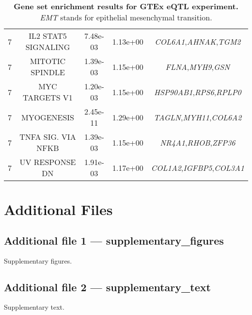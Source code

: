 \documentclass{bmcart}
\begin{document}
\begin{backmatter}
\begin{table}[]
\begin{tabular}{|| c | c | c | c | c ||}
      7 &               IL2 STAT5 SIGNALING &        7.48e-03 & 1.13e+00 &    \emph{COL6A1},\emph{AHNAK},\emph{TGM2} \\
      7 &                   MITOTIC SPINDLE &        1.39e-03 & 1.15e+00 &        \emph{FLNA},\emph{MYH9},\emph{GSN} \\
      7 &                    MYC TARGETS V1 &        1.20e-03 & 1.15e+00 &  \emph{HSP90AB1},\emph{RPS6},\emph{RPLP0} \\
      7 &                        MYOGENESIS &        2.45e-11 & 1.29e+00 &   \emph{TAGLN},\emph{MYH11},\emph{COL6A2} \\
      7 &           TNFA SIG. VIA NFKB &        1.39e-03 & 1.15e+00 &     \emph{NR4A1},\emph{RHOB},\emph{ZFP36} \\
      7 &                    UV RESPONSE DN &        1.91e-03 & 1.17e+00 & \emph{COL1A2},\emph{IGFBP5},\emph{COL3A1} \\
\hline
\end{tabular}
\caption{\textbf{Gene set enrichment results for GTEx eQTL experiment.} \emph{EMT} stands for epithelial mesenchymal transition.}
\end{table}



\section*{Additional Files}
  \subsection*{Additional file 1 --- supplementary\_figures}
    Supplementary figures.

  \subsection*{Additional file 2 --- supplementary\_text}
    Supplementary text.

\end{backmatter}
\end{document}
